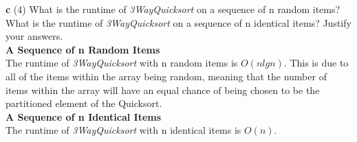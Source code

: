 \documentclass[12pt]{article}
\begin{document}
\linebreak
\textbf{c} (4) What is the runtime of \textit{3WayQuicksort} on a sequence of n random items? What is the runtime of \textit{3WayQuicksort} on a sequence of n identical items? Justify your answers.  \\
\linebreak
\textbf{A Sequence of n Random Items} \\
The runtime of \textit{3WayQuicksort} with n random items is $O(n lg n)$. This is due to all of the items within the array being random, meaning that the number of items within the array will have an equal chance of being chosen to be the partitioned element of the Quicksort.  \\
\linebreak
\textbf{A Sequence of n Identical Items} \\
The runtime of \textit{3WayQuicksort} with n identical items is $O(n)$. 
\end{document}
